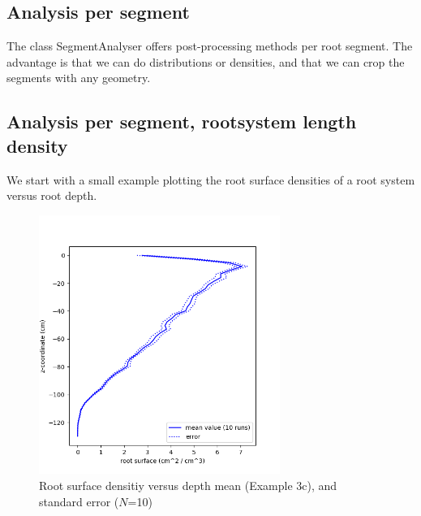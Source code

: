 \documentclass[a4paper]{article}
\begin{document}
\subsection{Analysis per segment}

The class SegmentAnalyser offers post-processing methods per root segment. The advantage is that we can do distributions or densities, and that we can crop the segments with any geometry. 


\subsection{Analysis per segment, rootsystem length density}

We start with a small example plotting the root surface densities of a root system versus root depth.



\begin{figure}
\centering
\includegraphics[width=0.7\textwidth]{example_3c.png}
\caption{Root surface densitiy versus depth mean (Example 3c), and standard error ($N$=10)} \label{fig:surface_density}
\end{figure}
\end{document}
